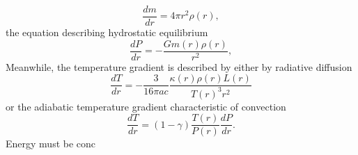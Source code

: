 \begin{equation}
    \frac{dm}{dr} = 4\pi r^2 \rho(r),
\end{equation}
the equation describing hydrostatic equilibrium
\begin{equation}
    \frac{dP}{dr} = -\frac{G m(r)\rho(r)}{r^2},
\end{equation}
Meanwhile, the temperature gradient is described by either by radiative diffusion
\begin{equation}
    \frac{dT}{dr} = -\frac{3}{16\pi ac}\frac{\kappa(r) \rho(r) L(r)}{T(r)^3 r^2}
\end{equation}
or the adiabatic temperature gradient characteristic of convection
\begin{equation}
    \frac{dT}{dr} = (1 - \gamma)\frac{T(r)}{P(r)}\frac{dP}{dr}.
\end{equation}
Energy must be conc